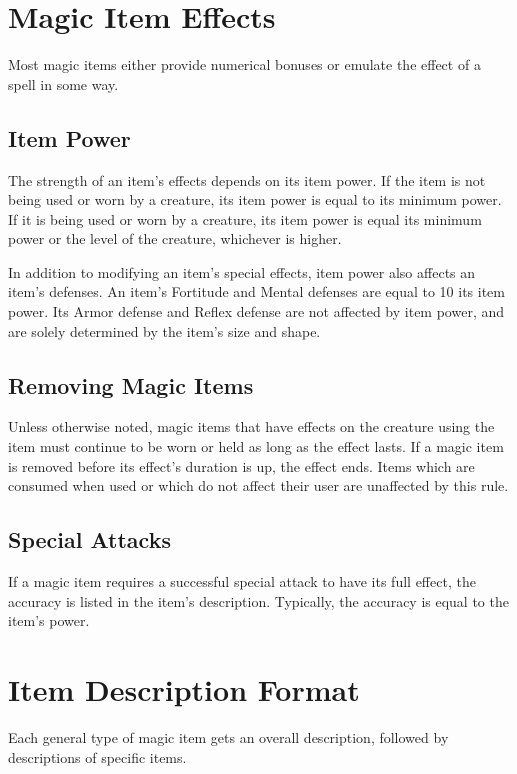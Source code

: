 \section{Magic Item Effects}
    Most magic items either provide numerical bonuses or emulate the effect of a spell in some way.

    \subsection{Item Power}\label{Item Power}
        The strength of an item's effects depends on its item power.
        If the item is not being used or worn by a creature, its item power is equal to its minimum power.
        If it is being used or worn by a creature, its item power is equal its minimum power or the level of the creature, whichever is higher.

        In addition to modifying an item's special effects, item power also affects an item's defenses.
        An item's Fortitude and Mental defenses are equal to 10 \add its item power.
        Its Armor defense and Reflex defense are not affected by item power, and are solely determined by the item's size and shape.

    \subsection{Removing Magic Items}
        Unless otherwise noted, magic items that have effects on the creature using the item must continue to be worn or held as long as the effect lasts.
        If a magic item is removed before its effect's duration is up, the effect ends.
        Items which are consumed when used or which do not affect their user are unaffected by this rule.

    \subsection{Special Attacks}
        If a magic item requires a successful special attack to have its full effect, the accuracy is listed in the item's description.
        Typically, the accuracy is equal to the item's power.

\section{Item Description Format}

    Each general type of magic item gets an overall description, followed by descriptions of specific items.

